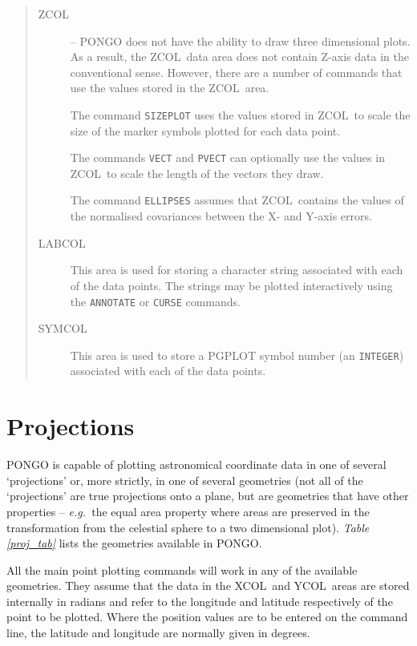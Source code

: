 \documentclass[twoside,11pt]{article}
\newcommand{\htmlref}[2]{#1}
\renewcommand{\_}{\texttt{\symbol{95}}}
\newcommand{\eg}{{\em e.g.\ }}
\newcommand{\xcol}{{\sf XCOL}}
\newcommand{\ycol}{{\sf YCOL}}
\newcommand{\zcol}{{\sf ZCOL}}
\newcommand{\symcol}{{\sf SYMCOL}}
\newcommand{\labcol}{{\sf LABCOL}}
\newcommand{\cnam}[1]{{\tt #1}}
\newcommand{\iref} [1]{\htmlref{#1}{#1}}
\begin{document}
\begin{quote}
\begin{description}
\item [\zcol] -- PONGO does not have the ability to draw three
dimensional plots.
As a result, the \zcol\ data area does not contain Z-axis data in the
conventional sense.
However, there are a number of commands that use the values stored in the
\zcol\ area.

The command \cnam{\iref{SIZEPLOT}} uses the values stored in \zcol\ to
scale the size of the marker symbols plotted for each data point.

The commands \cnam{\iref{VECT}} and \cnam{\iref{PVECT}} can optionally
use the values in \zcol\ to scale the length of the vectors they draw.

The command \cnam{\iref{ELLIPSES}} assumes that \zcol\ contains the
values of the normalised covariances between the X- and Y-axis errors.

\item [\labcol] This area is used for storing a character string
associated with each of the data points.  The strings may be plotted
interactively using the \cnam{\iref{ANNOTATE}} or \cnam{\iref{CURSE}}
commands.

\item [\symcol] This area is used to store a PGPLOT symbol number (an
\verb+INTEGER+) associated with each of the data points.

\end{description}
\end{quote}


\section{Projections} \label{proj_sect}

PONGO is capable of plotting astronomical coordinate data in one of several
`projections' or, more strictly, in one of several geometries (not all of the
`projections' are true projections onto a plane, but are geometries that have
other properties -- \eg the equal area property where areas are preserved in
the transformation from the celestial sphere to a two dimensional plot).
{\em Table \ref{proj_tab}} lists the geometries available in PONGO.

All the main point plotting commands will work in any of the available
geometries.
They assume that the data in the \xcol\ and \ycol\ areas are stored internally
in radians and refer to the longitude and latitude respectively of the point to
be plotted.
Where the position values are to be entered on the command line, the latitude
and longitude are normally given in degrees.
\end{document}
